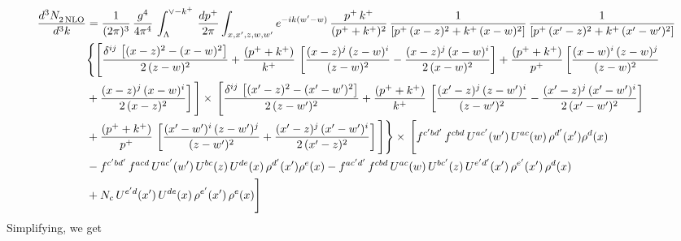 \documentclass[9pt]{article}
\numberwithin{equation}{section}
\begin{document}
\begin{align}
    \frac{d^{3}N_{2\,\rm NLO}^{\rm}}{d^{3}k}  & = \frac{1}{(2\pi)^{3}}\, \frac{g^{4}}{4\pi^{4}}\,\int_{\Lambda}^{\vee-k^{+}}\, \frac{dp^{+}}{2\pi}\int_{x,x',z,w,w^{\prime}} e^{-ik(w^{\prime}-w)}\,\frac{p^{+}\,k^{+}}{(p^{+}+k^{+})^{2}}\, \frac{1}{\left[p^{+}\,(x-z)^{2}+k^{+}\,(x-w)^{2}\right]}\,\frac{1}{\left[p^{+}\,(x'-z)^{2}+k^{+}\,(x'-w')^{2}\right]}\notag \\ & \Bigg\{\Bigg[\frac{\delta^{ij}\, \left[(x-z)^{2}-(x-w)^{2}\right]}{2\,(z-w)^{2}} + \frac{(p^{+}+k^{+})}{k^{+}}\, \left[\frac{(x-z)^{j}\,(z-w)^{i}}{(z-w)^{2}}-\frac{(x-z)^{j}\,(x-w)^{i}}{2\,(x-w)^{2}}\right]+\frac{(p^{+}+k^{+})}{p^{+}}\,\bigg[\frac{(x-w)^{i}\,(z-w)^{j}}{(z-w)^{2}}\notag \\ & +\frac{(x-z)^{j}\,(x-w)^{i}}{2\,(x-z)^{2}}\bigg]\,\Bigg]\times\, \Bigg[\frac{\delta^{ij}\, \left[(x'-z)^{2}-(x'-w')^{2}\right]}{2\,(z-w')^{2}}+ \frac{(p^{+}+k^{+})}{k^{+}}\, \left[\frac{(x'-z)^{j}\,(z-w')^{i}}{(z-w')^{2}}-\frac{(x'-z)^{j}\,(x'-w')^{i}}{2\,(x'-w')^{2}}\right]\notag \\ & +\frac{(p^{+}+k^{+})}{p^{+}}\,\left[\frac{(x'-w')^{i}\,(z-w')^{j}}{(z-w')^{2}} +\frac{(x'-z)^{j}\,(x'-w')^{i}}{2\,(x'-z)^{2}}\right] \Bigg] \Bigg\} \times\,  \Bigg[f^{c'bd'}\,f^{cbd}\, U^{ac'}(w')\,U^{ac}(w)\,\rho^{d'}(x')\rho^{d}(x)\notag \\ & - f^{c'bd'}\,f^{acd}\,U^{ac'}(w')\,U^{bc}(z)\,U^{de}(x)\,\rho^{d'}(x')\rho^{e}(x) -f^{ac'd'}\,f^{cbd}\,U^{ac}(w)\,U^{bc'}(z)\,U^{e'd'}(x')\,\rho^{e'}(x')\,\rho^{d}(x)\notag \\ & +N_{c}\,U^{e'd}(x')\,U^{de}(x)\,\rho^{e'}(x')\,\rho^{e}(x)\Bigg]
\end{align}
Simplifying, we get
\end{document}
